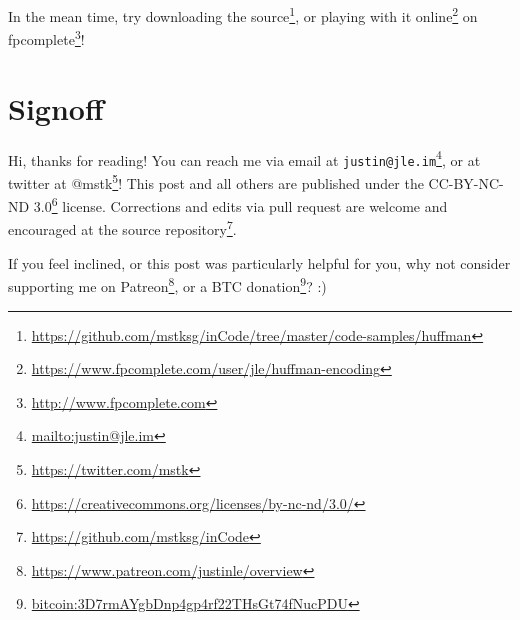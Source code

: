 \documentclass[]{article}
\renewcommand{\href}[2]{#2\footnote{\url{#1}}}
\begin{document}
In the mean time, try
\href{https://github.com/mstksg/inCode/tree/master/code-samples/huffman}{downloading
the source}, or
\href{https://www.fpcomplete.com/user/jle/huffman-encoding}{playing with it
online} on \href{http://www.fpcomplete.com}{fpcomplete}!

\section{Signoff}\label{signoff}

Hi, thanks for reading! You can reach me via email at
\href{mailto:justin@jle.im}{\nolinkurl{justin@jle.im}}, or at twitter at
\href{https://twitter.com/mstk}{@mstk}! This post and all others are published
under the \href{https://creativecommons.org/licenses/by-nc-nd/3.0/}{CC-BY-NC-ND
3.0} license. Corrections and edits via pull request are welcome and encouraged
at \href{https://github.com/mstksg/inCode}{the source repository}.

If you feel inclined, or this post was particularly helpful for you, why not
consider \href{https://www.patreon.com/justinle/overview}{supporting me on
Patreon}, or a \href{bitcoin:3D7rmAYgbDnp4gp4rf22THsGt74fNucPDU}{BTC donation}?
:)
\end{document}
